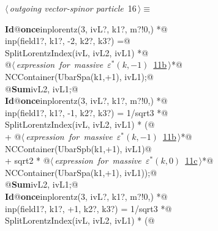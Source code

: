 \documentclass[a4paper,12pt]{amsart}
\renewcommand{\NWtarget}[2]{\hypertarget{#1}{#2}}
\renewcommand{\NWlink}[2]{\hyperlink{#1}{#2}}
\begin{document}
\begin{flushleft} \small
\begin{minipage}{\linewidth}\label{scrap35}\raggedright\small
\NWtarget{nuweb16}{} $\langle\,${\itshape outgoing vector-spinor particle}\nobreak\ {\footnotesize {16}}$\,\rangle\equiv$
\vspace{-1ex}
\begin{list}{}{} \item
\mbox{}\verb@@\hbox{\sffamily\bfseries Id}\verb@ @\hbox{\sffamily\bfseries once}\verb@ inplorentz(3, ivL?, k1?, m?!{0,}) *@\\
\mbox{}\verb@      inp(field1?, k1?, -2, k2?, k3?) =@\\
\mbox{}\verb@   SplitLorentzIndex(ivL, ivL2, ivL1) *@\\
\mbox{}\verb@   @\hbox{$\langle\,${\itshape expression for massive $\varepsilon^\ast(k, -1)$}\nobreak\ {\footnotesize \NWlink{nuweb11b}{11b}}$\,\rangle$}\verb@ *@\\
\mbox{}\verb@   NCContainer(UbarSpa(k1,+1), ivL1);@\\
\mbox{}\verb@   @\hbox{\sffamily\bfseries Sum}\verb@ ivL2, ivL1;@\\
\mbox{}\verb@@\hbox{\sffamily\bfseries Id}\verb@ @\hbox{\sffamily\bfseries once}\verb@ inplorentz(3, ivL?, k1?, m?!{0,}) *@\\
\mbox{}\verb@      inp(field1?, k1?, -1, k2?, k3?) = 1/sqrt3 *@\\
\mbox{}\verb@   SplitLorentzIndex(ivL, ivL2, ivL1) * (@\\
\mbox{}\verb@   + @\hbox{$\langle\,${\itshape expression for massive $\varepsilon^\ast(k, -1)$}\nobreak\ {\footnotesize \NWlink{nuweb11b}{11b}}$\,\rangle$}\verb@ *@\\
\mbox{}\verb@     NCContainer(UbarSpb(k1,+1), ivL1)@\\
\mbox{}\verb@   + sqrt2 * @\hbox{$\langle\,${\itshape expression for massive $\varepsilon^\ast(k, 0)$}\nobreak\ {\footnotesize \NWlink{nuweb11c}{11c}}$\,\rangle$}\verb@ *@\\
\mbox{}\verb@     NCContainer(UbarSpa(k1,+1), ivL1));@\\
\mbox{}\verb@   @\hbox{\sffamily\bfseries Sum}\verb@ ivL2, ivL1;@\\
\mbox{}\verb@@\hbox{\sffamily\bfseries Id}\verb@ @\hbox{\sffamily\bfseries once}\verb@ inplorentz(3, ivL?, k1?, m?!{0,}) *@\\
\mbox{}\verb@      inp(field1?, k1?, +1, k2?, k3?) = 1/sqrt3 *@\\
\mbox{}\verb@   SplitLorentzIndex(ivL, ivL2, ivL1) * (@\\

\end{list}
\end{minipage}
\end{flushleft}
\end{document}
